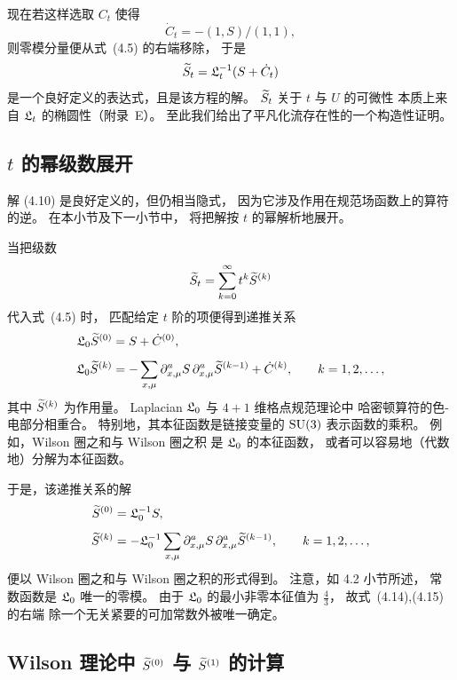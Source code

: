 现在若这样选取 $C_t$ 使得
\begin{equation}
   \dot{C}_t=-(1,S)/(1,1),
\end{equation}
则零模分量便从式~(4.5) 的右端移除，
于是
\begin{equation}
   \widetilde{S}_t=\mathfrak{L}_t^{-1}(S+\dot{C}_t)
\end{equation}
是一个良好定义的表达式，且是该方程的解。
$\widetilde{S}_t$ 关于 $t$ 与 $U$ 的可微性
本质上来自 $\mathfrak{L}_t$ 的椭圆性（附录~E）。
至此我们给出了平凡化流存在性的一个构造性证明。


\subsection{$t$ 的幂级数展开}

解 (4.10) 是良好定义的，但仍相当隐式，
因为它涉及作用在规范场函数上的算符的逆。
在本小节及下一小节中，
将把解按 $t$ 的幂解析地展开。

当把级数
\begin{equation}
  \widetilde{S}_t=\sum_{k=0}^{\infty}t^k\widetilde{S}^{(k)}
\end{equation}
代入式~(4.5) 时，
匹配给定 $t$ 阶的项便得到递推关系
\begin{align}
  \mathfrak{L}_0\widetilde{S}^{(0)}&=S+\dot{C}^{(0)},
  \\[1.0ex]
  \mathfrak{L}_0\widetilde{S}^{(k)}&
  =-\sum_{x,\mu}\partial^a_{x,\mu}S\,\partial^a_{x,\mu}\widetilde{S}^{(k-1)}
  +\dot{C}^{(k)},\qquad
  k=1,2,\ldots,
\end{align}
其中 $\widetilde{S}^{(k)}$ 为作用量。
Laplacian $\mathfrak{L}_0$ 与 $4+1$ 维格点规范理论中
哈密顿算符的色-电部分相重合。
特别地，其本征函数是链接变量的
$\mathrm{SU}(3)$ 表示函数的乘积。
例如，Wilson 圈之和与 Wilson 圈之积
是 $\mathfrak{L}_0$ 的本征函数，
或者可以容易地（代数地）分解为本征函数。

于是，该递推关系的解
\begin{align}
  \widetilde{S}^{(0)}&=\mathfrak{L}_0^{-1}S,
  \\[1.0ex]
  \widetilde{S}^{(k)}&=-\mathfrak{L}_0^{-1}
  \sum_{x,\mu}\partial^a_{x,\mu}S\,\partial^a_{x,\mu}
  \widetilde{S}^{(k-1)},\qquad k=1,2,\ldots,
\end{align}
便以 Wilson 圈之和与 Wilson 圈之积的形式得到。
注意，如 4.2 小节所述，
常数函数是 $\mathfrak{L}_0$ 唯一的零模。
由于 $\mathfrak{L}_0$ 的最小非零本征值为 $\frac{4}{3}$，
故式~(4.14),(4.15) 的右端
除一个无关紧要的可加常数外被唯一确定。


\subsection{Wilson 理论中\/ $\widetilde{S}^{(0)}$ 与\/ $\widetilde{S}^{(1)}$ 的计算}

